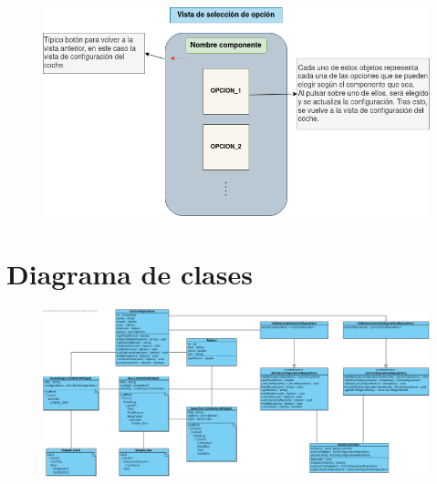 \begin{figure}[H]
\centering
\includegraphics[scale=0.55]{imagenes/conf_componente_view.drawio.png}
\end{figure}

\newpage


\section{Diagrama de clases}


\begin{figure}[H]
\centering
\includegraphics[scale=0.4]{imagenes/ds-diagramaclases.png}
\end{figure}

\newpage



